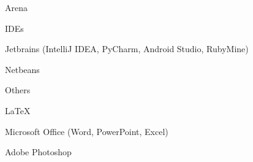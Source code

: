 \begin{cventries}
{\begin{cvitems}
                \item{Arena}
            \end{cvitems}
        }
    \cventry
        {}
        {IDEs}
        {}
        {}
        {
            \begin{cvitems}
                \item{Jetbrains (IntelliJ IDEA, PyCharm, Android Studio, RubyMine)}
                \item{Netbeans}
            \end{cvitems}
        }
    \cventry
        {}
        {Others}
        {}
        {}
        {
            \begin{cvitems}
                  \item{LaTeX}
                  \item{Microsoft Office (Word, PowerPoint, Excel)}
                  \item{Adobe Photoshop}
            \end{cvitems}
        }

\end{cventries}
